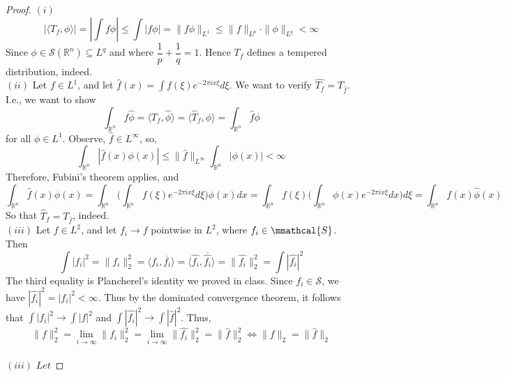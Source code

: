 \documentclass[12pt]{article}
\newenvironment{exercise}[2][Exercise]{\begin{trivlist}
\item[\hskip \labelsep {\bfseries #1}\hskip \labelsep {\bfseries #2.}]}{\end{trivlist}}
\begin{document}
\begin{proof}
  $(i)$
  $$|\langle T_f, \phi \rangle| = |\int f \phi| \le \int |f \phi| = \|f \phi\|_{L^1} \le \|f\|_{L^p} \cdot \|\phi\|_{L^q} < \infty$$
  Since $\phi \in \mathcal{S}(\mathbb{R}^n) \subseteq L^q$ and where $\dfrac{1}{p} + \dfrac{1}{q} = 1$. Hence $T_f$ defines a tempered distribution, indeed.\\
  $(ii)$ Let $f \in L^1$, and let $\hat{f}(x) = \int f(\xi) e^{- 2 \pi i x \xi} d\xi$. We want to verify $\hat{T_f} = T_{\hat{f}}$. I.e., we want to show $$\int_{\mathbb{R}^n} f\hat{\phi} = \langle T_f, \hat{\phi} \rangle = \langle \hat{T}_f, \phi \rangle = \int_{\mathbb{R}^n} \hat{f} \phi$$
  for all $\phi \in L^1$. Observe, $\hat{f} \in L^{\infty}$, so, $$\int_{\mathbb{R}^n} |\hat{f}(x) \phi(x)| \le \|\hat{f}\|_{L^{\infty}} \int_{\mathbb{R}^n} |\phi(x)| < \infty$$
  Therefore, Fubini's theorem applies, and
  $$\int_{\mathbb{R}^n} \hat{f}(x) \phi(x) = \int_{\mathbb{R}^n} \Big(\int_{\mathbb{R}^n} f(\xi) e^{-2 \pi i x \xi} d\xi \Big) \phi(x) dx = \int_{\mathbb{R}^n} f(\xi) \Big(\int_{\mathbb{R}^n} \phi(x) e^{-2 \pi i x \xi} dx \Big) d\xi = \int_{\mathbb{R}^n} f(x) \hat{\phi}(x)$$
  So that $\hat{T}_f = T_{\hat{f}}$, indeed.\\
  $(iii)$ Let $f \in L^2$, and let $f_i \rightarrow f$ pointwise in $L^2$, where $f_i \in \mmathcal{S}$. Then
  $$\int |f_i|^2 = \| f_i \|^2_2 = \langle f_i, \overline{f_i} \rangle = \langle \hat{f_i}, \overline{\hat{f_i}} \rangle = \|\hat{f_i} \|^2_2 = \int |\hat{f_i}|^2$$
  The third equality is Plancherel's identity we proved in class.
  Since $f_i \in \mathcal{S}$, we have $|\hat{f_i}|^2 = |f_i|^2 < \infty$. Thus by the dominated convergence theorem, it follows that $\int |f_i|^2 \rightarrow \int |f|^2$ and $\int |\hat{f_i}|^2 \rightarrow \int |\hat{f}|^2$. Thus,
  $$\|f\|^2_2 = \lim_{i \rightarrow \infty} \|f_i\|^2_2 = \lim_{i \rightarrow \infty} \|\hat{f_i}\|^2_2 = \|\hat{f}\|^2_2 \iff \|f\|_2 = \|\hat{f}\|_2$$\\
  $(iii)$ $Let$
\end{proof}

\begin{exercise}{4}
\end{exercise}
\end{document}
